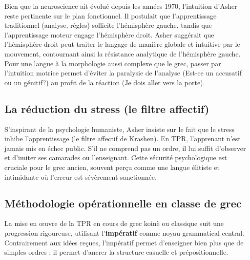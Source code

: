 Bien que la neuroscience ait évolué depuis les années 1970, l'intuition d'Asher reste pertinente sur
le plan fonctionnel. Il postulait que l'apprentissage traditionnel (analyse, règles) sollicite
l'hémisphère gauche, tandis que l'apprentissage moteur engage l'hémisphère
droit.\cite{III-2-2-ref22} Asher suggérait que l'hémisphère droit peut traiter le langage de manière
globale et intuitive par le mouvement, contournant ainsi la \og résistance\fg{} analytique de
l'hémisphère gauche. Pour une langue à la morphologie aussi complexe que le grec, passer par
l'intuition motrice permet d'éviter la paralysie de l'analyse (\og Est-ce un accusatif ou un
génitif?\fg{}) au profit de la réaction (\og Je dois aller vers la porte\fg{}).



\subsection{La réduction du stress (le filtre affectif)}

S'inspirant de la psychologie humaniste, Asher insiste sur le fait que le stress inhibe
l'apprentissage (le \og filtre affectif\fg{} de Krashen).\cite{III-2-2-ref16} En TPR, l'apprenant
n'est jamais mis en échec public. S'il ne comprend pas un ordre, il lui suffit d'observer et
d'imiter ses camarades ou l'enseignant. Cette sécurité psychologique est cruciale pour le grec
ancien, souvent perçu comme une langue élitiste et intimidante où l'erreur est sévèrement
sanctionnée.



\subsection{Méthodologie opérationnelle en classe de grec}

La mise en œuvre de la TPR en cours de grec koinè ou classique suit une progression rigoureuse,
utilisant l'\textbf{impératif} comme noyau grammatical central. Contrairement aux idées reçues,
l'impératif permet d'enseigner bien plus que de simples ordres ; il permet d'ancrer la structure
casuelle et prépositionnelle.


